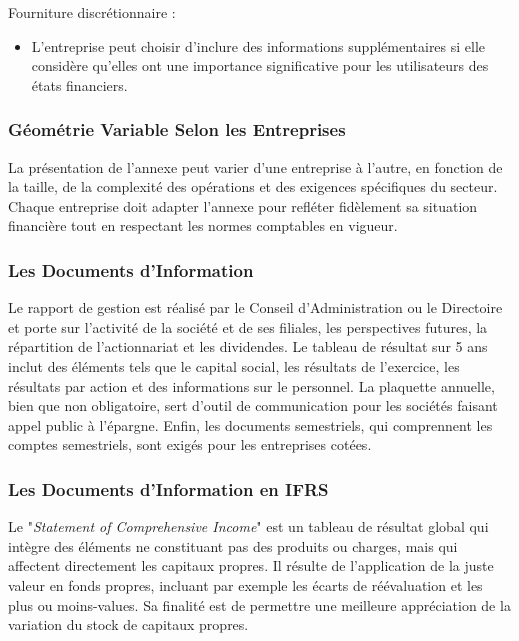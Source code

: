 \documentclass[a4paper, 12pt]{report}
\begin{document}
Fourniture discrétionnaire :
\begin{itemize}
	\item L'entreprise peut choisir d'inclure des informations supplémentaires si elle considère qu'elles ont une importance significative pour les utilisateurs des états financiers.
\end{itemize}

\subsubsection{Géométrie Variable Selon les Entreprises}

La présentation de l'annexe peut varier d'une entreprise à l'autre, en fonction de la taille, de la complexité des opérations et des exigences spécifiques du secteur. Chaque entreprise doit adapter l'annexe pour refléter fidèlement sa situation financière tout en respectant les normes comptables en vigueur.

\subsubsection{Les Documents d'Information}

Le rapport de gestion est réalisé par le Conseil d'Administration ou le Directoire et porte sur l'activité de la société et de ses filiales, les perspectives futures, la répartition de l'actionnariat et les dividendes. Le tableau de résultat sur 5 ans inclut des éléments tels que le capital social, les résultats de l'exercice, les résultats par action et des informations sur le personnel. La plaquette annuelle, bien que non obligatoire, sert d'outil de communication pour les sociétés faisant appel public à l'épargne. Enfin, les documents semestriels, qui comprennent les comptes semestriels, sont exigés pour les entreprises cotées.

\subsubsection{Les Documents d'Information en IFRS}

Le "\textit{Statement of Comprehensive Income}" est un tableau de résultat global qui intègre des éléments ne constituant pas des produits ou charges, mais qui affectent directement les capitaux propres. Il résulte de l'application de la juste valeur en fonds propres, incluant par exemple les écarts de réévaluation et les plus ou moins-values. Sa finalité est de permettre une meilleure appréciation de la variation du stock de capitaux propres. 
\end{document}
